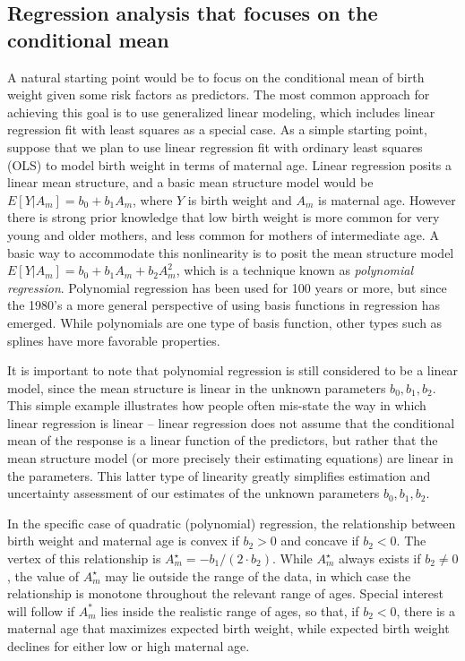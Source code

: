 \subsection{Regression analysis that focuses on the conditional mean}

A natural starting point would be to focus on the conditional mean of birth weight given some risk factors as predictors.  The most common approach for achieving this goal is to use generalized linear modeling, which includes linear regression fit with least squares as a special case.  As a simple starting point, suppose that we plan to use linear regression fit with ordinary least squares (OLS) to model birth weight in terms of maternal age.  Linear regression posits a linear mean structure, and a basic mean structure model would be $E[Y|A_m] = b_0 + b_1A_m$, where $Y$ is birth weight and $A_m$ is maternal age.  However there is strong prior knowledge that low birth weight is more common for very young and older mothers, and less common for mothers of intermediate age.  A basic way to accommodate this nonlinearity is to posit the mean structure model $E[Y|A_m] = b_0 + b_1A_m + b_2A_m^2$, which is a technique known as {\em polynomial regression}. Polynomial regression has been used for 100 years or more, but since the 1980's a more general perspective of using basis functions in regression has emerged.  While polynomials are one type of basis function, other types such as splines have more favorable properties.

It is important to note that polynomial regression is still considered to be a linear model, since the mean structure is linear in the unknown parameters $b_0, b_1, b_2$.  This simple example illustrates how people often mis-state the way in which linear regression is linear -- linear regression does not assume that the conditional mean of the response is a linear function of the predictors, but rather that the mean structure model (or more precisely their estimating equations) are linear in the parameters.  This latter type of linearity greatly simplifies estimation and uncertainty assessment of our estimates of the unknown parameters $b_0, b_1, b_2$.

In the specific case of quadratic (polynomial) regression, the relationship between birth weight and maternal age is convex if $b_2 > 0$ and concave if $b_2 < 0$.  The vertex of this relationship is $A_m^\star = -b_1/(2\cdot b_2)$.  While $A_m^\star$ always exists if $b_2 \ne 0$, the value of $A_m^\star$ may lie outside the range of the data, in which case the relationship is monotone throughout the relevant range of ages.  Special interest will follow if $A_m^*$ lies inside the realistic range of ages, so that, if $b_2 < 0$, there is a maternal age that maximizes expected birth weight, while expected birth weight declines for either low or high maternal age.


